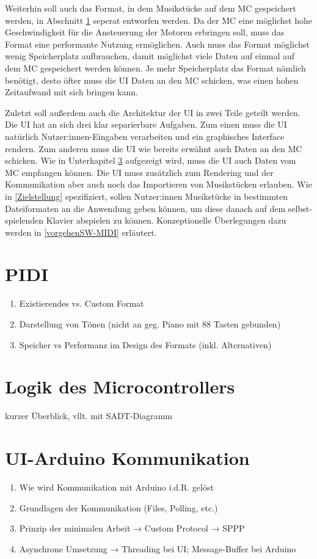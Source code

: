 Weiterhin soll auch das Format, in dem Musikstücke auf dem \ac{MC} gespeichert werden, in Abschnitt \ref{vorgehenSW-PIDI} seperat entworfen werden.
Da der \ac{MC} eine möglichst hohe Geschwindigkeit für die Ansteuerung der Motoren erbringen soll, muss das Format eine performante Nutzung ermöglichen.
Auch muss das Format möglichst wenig Speicherplatz aufbrauchen, damit möglichst viele Daten auf einmal auf dem \ac{MC} gespeichert werden können.
Je mehr Speicherplatz das Format nämlich benötigt, desto öfter muss die \ac{UI} Daten an den \ac{MC} schicken, was einen hohen Zeitaufwand mit sich bringen kann.

Zuletzt soll außerdem auch die Architektur der \ac{UI} in zwei Teile geteilt werden.
Die \ac{UI} hat an sich drei klar separierbare Aufgaben.
Zum einen muss die \ac{UI} natürlich Nutzer:innen-Eingaben verarbeiten und ein graphisches Interface rendern.
Zum anderen muss die \ac{UI} wie bereits erwähnt auch Daten an den \ac{MC} schicken.
Wie in Unterkapitel \ref{vorgehenSW-SPPP} aufgezeigt wird, muss die \ac{UI} auch Daten vom \ac{MC} empfangen können.
Die UI muss zusätzlich zum Rendering und der Kommunikation aber auch noch das Importieren von Musikstücken erlauben.
Wie in \ref{Zielstellung} spezifiziert, sollen Nutzer:innen Musikstücke in bestimmten Dateiformaten an die Anwendung geben können, um diese danach auf dem selbst-spielenden Klavier abspielen zu können.
Konzeptionelle Überlegungen dazu werden in \ref{vorgehenSW-MIDI} erläutert.


\section{PIDI} \label{vorgehenSW-PIDI}
\begin{enumerate}
	\item Existierendes vs. Custom Format
	\item Darstellung von Tönen (nicht an geg. Piano mit 88 Tasten gebunden)
	\item Speicher vs Performanz im Design des Formats (inkl. Alternativen)
\end{enumerate}

\section{Logik des Microcontrollers} \label{vorgehenSW-MC}
kurzer Überblick, vllt. mit SADT-Diagramm

\section{UI-Arduino Kommunikation} \label{vorgehenSW-SPPP}
\begin{enumerate}
	\item Wie wird Kommunikation mit Arduino i.d.R. gelöst
	\item Grundlagen der Kommunikation (Files, Polling, etc.)
	\item Prinzip der minimalen Arbeit → Custom Protocol → SPPP
	\item Asynchrone Umsetzung → Threading bei UI; Message-Buffer bei Arduino
\end{enumerate}

